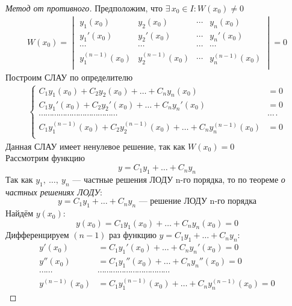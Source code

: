 \begin{proof}[Метод от противного]
    Предположим, что $\exists\, x_0 \in I\colon W(x_0) \ne 0$
    \begin{gather*}
        W (x_0) = \begin{vmatrix}
            y_1(x_0) & y_2(x_0) & \cdots & y_n(x_0) \\
            y_1'(x_0) & y_2'(x_0) & \cdots & y_n'(x_0) \\
            \cdots & \cdots & \cdots & \cdots \\
            y_1^{(n-1)}(x_0) & y_2^{(n-1)}(x_0) & \cdots & y_n^{(n-1)}(x_0)\\
        \end{vmatrix} = 0
    \end{gather*}
    Построим СЛАУ по определителю
    \begin{gather*}
        \left\{ \begin{aligned}
            C_1 y_1(x_0) + C_2 y_2(x_0) + \ldots + C_n y_n(x_0) &= 0\\
            C_1 y_1'(x_0) + C_2 y_2'(x_0) + \ldots + C_n y_n'(x_0) &= 0\\
            \cdots\cdots\cdots\cdots\cdots\cdots\cdots\cdots\cdots\cdots\cdots\cdots&\cdots\cdot \\
            C_1 y_1^{(n-1)}(x_0) + C_2 y_2^{(n-1)}(x_0) + \ldots + C_n y_n^{(n-1)}(x_0) &= 0 \\
        \end{aligned} \right.
    \end{gather*}
    Данная СЛАУ имеет ненулевое решение, так как $W(x_0) = 0$\\
    Рассмотрим функцию 
    \[
    y = C_1y_1 + \ldots + C_ny_n
    \]
    Так как $y_1,\ \ldots,\ y_n$ --- частные решения ЛОДУ n-го порядка, то по теореме \textit{о частных решениях ЛОДУ}:
    \[
        y = C_1y_1 + \ldots + C_ny_n \text{ --- решение ЛОДУ n-го порядка}
    \]
    Найдём $y(x_0)$:
    \[
        y(x_0) = C_1y_1(x_0) + \ldots + C_ny_n(x_0) = 0
    \]
    Дифференцируем $(n-1)$ раз функцию $y = C_1y_1 + \ldots + C_ny_n$:
    \begin{align*}
        y'(x_0) &= C_1y_1'(x_0) + \ldots + C_ny_n'(x_0) = 0 \\
        y''(x_0) &= C_1y_1''(x_0) + \ldots + C_ny_n''(x_0) = 0 \\
        \cdots\cdots&\cdots\cdots\cdots\cdots\cdots\cdots\cdots\cdots\cdots\cdots\cdots \\
        y^{(n-1)}(x_0) &= C_1y_1^{(n-1)}(x_0) + \ldots + C_ny_n^{(n-1)}(x_0) = 0

\end{align*}
\end{proof}
